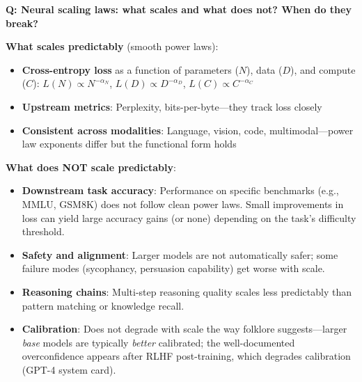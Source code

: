 \medskip

\begin{interviewq}
\textbf{Q: Neural scaling laws: what scales and what does not? When do they break?}

 \quad {} \quad \badgefreq{\freqmed}

\stronganswer
\textbf{What scales predictably} (smooth power laws):
\begin{itemize}
    \item \textbf{Cross-entropy loss} as a function of parameters ($N$), data ($D$), and compute ($C$): $L(N) \propto N^{-\alpha_N}$, $L(D) \propto D^{-\alpha_D}$, $L(C) \propto C^{-\alpha_C}$
    \item \textbf{Upstream metrics}: Perplexity, bits-per-byte---they track loss closely
    \item \textbf{Consistent across modalities}: Language, vision, code, multimodal---power law exponents differ but the functional form holds
\end{itemize}

\textbf{What does NOT scale predictably}:
\begin{itemize}
    \item \textbf{Downstream task accuracy}: Performance on specific benchmarks (e.g., MMLU, GSM8K) does not follow clean power laws. Small improvements in loss can yield large accuracy gains (or none) depending on the task's difficulty threshold.
    \item \textbf{Safety and alignment}: Larger models are not automatically safer; some failure modes (sycophancy, persuasion capability) get worse with scale.
    \item \textbf{Reasoning chains}: Multi-step reasoning quality scales less predictably than pattern matching or knowledge recall.
    \item \textbf{Calibration}: Does not degrade with scale the way folklore suggests---larger \textit{base} models are typically \textit{better} calibrated; the well-documented overconfidence appears after RLHF post-training, which degrades calibration (GPT-4 system card).
\end{itemize}


\end{interviewq}
